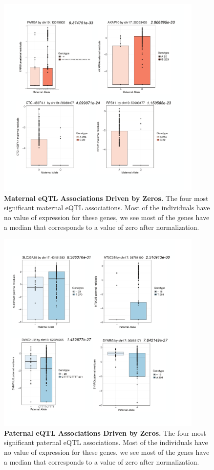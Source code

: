 \begin{figure}[!htb]
\centering \includegraphics[width=4in]{img/ch04/fig-04-mat-eQTL.pdf}
\caption[Maternal eQTL Associations Driven by Zeros.]{\textbf{Maternal eQTL Associations Driven by Zeros.} The four most significant maternal eQTL associations. Most of the individuals have no value of expression for these genes, we see most of the genes have a median that corresponds to a value of zero after normalization. }
\label{fig:mat-eQTL}
\end{figure}

\begin{figure}[!htb]
\centering \includegraphics[width=4in]{img/ch04/fig-05-pat-eQTL.pdf}
\caption[Paternal eQTL Associations Driven by Zeros.]{\textbf{Paternal eQTL Associations Driven by Zeros.} The four most significant paternal eQTL associations. Most of the individuals have no value of expression for these genes, we see most of the genes have a median that corresponds to a value of zero after normalization. }
\label{fig:pat-eQTL}
\end{figure}


